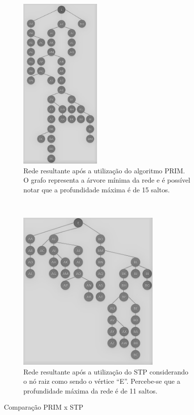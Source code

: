 \documentclass[12pt]{article}
\begin{document}
\begin{figure}[t!]
	\centering
	\begin{subfigure}[t]{0.4\textwidth}
		\centering
		\includegraphics[width=4cm]{Otimizada_Prim_PB} %
		\caption{Rede resultante após a utilização do algoritmo PRIM. O grafo representa a árvore mínima da rede e é possível notar que a profundidade máxima é de 15 saltos.}
		\label{fig_rede_otimizada_prim}
	\end{subfigure}%
	~
	\begin{subfigure}[t]{0.5\textwidth}
		\centering
		\includegraphics[width=7cm]{Otimizada_STP_PB} %
	\caption{Rede resultante após a utilização do STP considerando o nó raiz como sendo o vértice ``E''. Percebe-se que a profundidade máxima da rede é de 11 saltos.}
	\label{fig_rede_otimizada_STP}
	\end{subfigure}
	\caption{Comparação PRIM x STP}
	\label{fig_redes_otimizadas_classico}
\end{figure}
\end{document}
